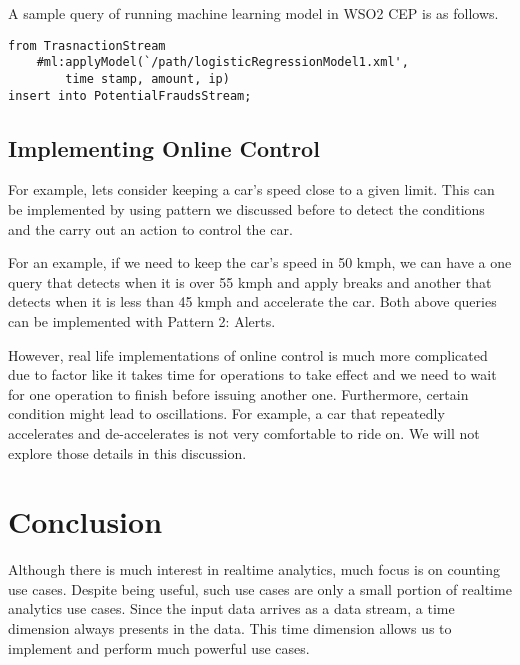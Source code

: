 \documentclass{sig-alternate}
\begin{document}
{A sample query of running machine learning model in WSO2 CEP is as follows.


\begin{lstlisting}[mathescape, showstringspaces=false]
from TrasnactionStream
	#ml:applyModel(`/path/logisticRegressionModel1.xml',  
		time stamp, amount, ip) 
insert into PotentialFraudsStream;
\end{lstlisting} 

\subsection{Implementing Online Control} 

For example, lets consider keeping a car's speed close to a given limit. This can be implemented by using pattern we discussed before to detect the conditions and the carry out an action to control the car. 

For an example, if we need to keep the car's speed in 50 kmph, we can have a one query that detects when it is over 55 kmph and apply breaks and another that detects when it is less than 45 kmph and accelerate the car. Both above queries can be implemented with Pattern 2: Alerts. 

However, real life implementations of online control is much more complicated due to factor like it takes time for operations to take effect and we need to wait for one operation to finish before issuing another one. Furthermore, certain condition might lead to oscillations. For example, a car that repeatedly accelerates and de-accelerates is not very comfortable to ride on. We will not explore those details in this discussion. 

\section{Conclusion} 

Although there is much interest in realtime analytics, much focus is on counting use cases. Despite being useful, such use cases are only a small portion of realtime analytics use cases. Since the input data arrives as a data stream, a time dimension always presents in the data. This time dimension allows us to implement and perform much powerful use cases.  

}
\end{document}
